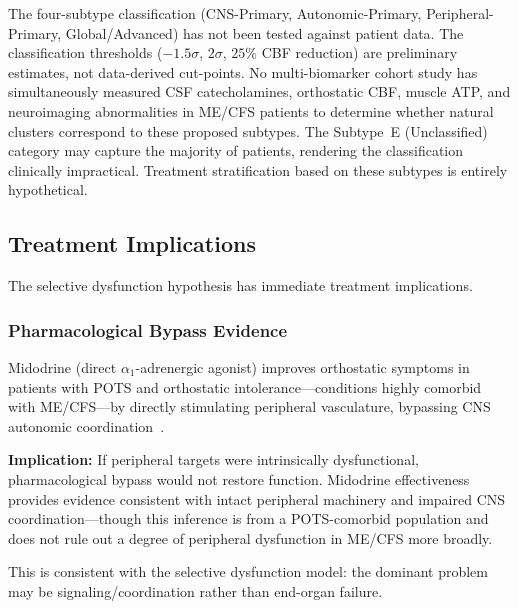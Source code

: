 \begin{limitation}
The four-subtype classification (CNS-Primary, Autonomic-Primary, Peripheral-Primary, Global/Advanced) has not been tested against patient data. The classification thresholds ($-1.5\sigma$, $2\sigma$, $25\%$ CBF reduction) are preliminary estimates, not data-derived cut-points. No multi-biomarker cohort study has simultaneously measured CSF catecholamines, orthostatic CBF, muscle ATP, and neuroimaging abnormalities in ME/CFS patients to determine whether natural clusters correspond to these proposed subtypes. The Subtype~E (Unclassified) category may capture the majority of patients, rendering the classification clinically impractical. Treatment stratification based on these subtypes is entirely hypothetical.
\end{limitation}

\subsection{Treatment Implications}

The selective dysfunction hypothesis has immediate treatment implications.

\subsubsection{Pharmacological Bypass Evidence}

\begin{observation}
\label{obs:midodrine}
Midodrine (direct $\alpha_1$-adrenergic agonist) improves orthostatic symptoms in patients with POTS and orthostatic intolerance---conditions highly comorbid with ME/CFS---by directly stimulating peripheral vasculature, bypassing CNS autonomic coordination~\cite{Ojha2024pediatricPOTS}.

\textbf{Implication:} If peripheral targets were intrinsically dysfunctional, pharmacological bypass would not restore function. Midodrine effectiveness provides evidence consistent with intact peripheral machinery and impaired CNS coordination---though this inference is from a POTS-comorbid population and does not rule out a degree of peripheral dysfunction in ME/CFS more broadly.

This is consistent with the selective dysfunction model: the dominant problem may be signaling/coordination rather than end-organ failure.
\end{observation}

